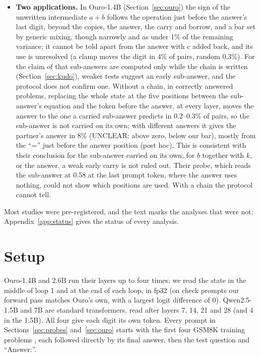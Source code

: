 \documentclass{article}
\begin{document}
\begin{itemize}
\item \textbf{Two applications.} In Ouro-1.4B (Section~\ref{sec:ouro}) the sign of the unwritten intermediate $a+b$ follows the operation just before the answer's last digit, beyond the copies, the answer, the carry and borrow, and a bar set by generic mixing, though narrowly and as under 1\% of the remaining variance; it cannot be told apart from the answer with $c$ added back, and its use is unresolved (a clamp moves the digit in 4\% of pairs, random 0.3\%). For the claim of \citet{kudo2026} that sub-answers are computed only while the chain is written (Section~\ref{sec:kudo}), weaker tests suggest an early sub-answer, and the protocol does not confirm one. Without a chain, in correctly answered problems, replacing the whole state at the five positions between the sub-answer's equation and the token before the answer, at every layer, moves the answer to the one a carried sub-answer predicts in 0.2--0.3\% of pairs, so the sub-answer is not carried on its own; with different answers it gives the partner's answer in 8\% (UNCLEAR: above zero, below our bar), mostly from the ``='' just before the answer position (post hoc). This is consistent with their conclusion for the sub-answer carried on its own; for $b$ together with $k$, or the answer, a weak early carry is not ruled out. Their probe, which reads the sub-answer at 0.58 at the last prompt token, where the answer uses nothing, could not show which positions are used. With a chain the protocol cannot tell.
\end{itemize}
Most studies were pre-registered, and the text marks the analyses that were not; Appendix~\ref{app:status} gives the status of every analysis.

\section{Setup}\label{sec:setup}

Ouro-1.4B and 2.6B \citep{zhu2025ouro} run their layers up to four times; we read the state in the middle of loop 1 and at the end of each loop, in fp32 (on check prompts our forward pass matches Ouro's own, with a largest logit difference of 0). Qwen2.5-1.5B and 7B \citep{qwen2025} are standard transformers, read after layers 7, 14, 21 and 28 (and 4 in the 1.5B). All four give each digit its own token. Every prompt in Sections~\ref{sec:probes} and~\ref{sec:ouro} starts with the first four GSM8K training problems \citep{cobbe2021}, each followed directly by its final answer, then the test question and ``Answer:''.
\end{document}
